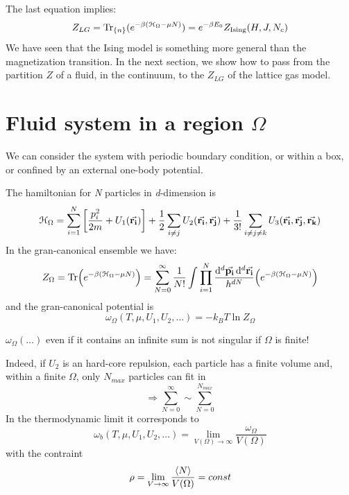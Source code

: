 \documentclass[../main/main.tex]{subfiles}
\begin{document}
The last equation implies:
\begin{equation}
  Z_{LG} = \Tr_{\{n\}}(e^{-\beta (\mathcal{H}_ \Omega -\mu N)} ) = e^{-\beta E_0} Z_{\text{Ising}} (H,J,N_c)
\end{equation}
We have seen that the Ising model is something more general than the magnetization transition.
In the next section, we show how to pass from the partition \( Z \) of a fluid, in the continuum, to the  \( Z_{LG} \) of the lattice gas model.

\section{Fluid system in a region \( \Omega  \) }
We can consider the system with periodic boundary condition, or within a box, or confined by an external one-body potential.

The hamiltonian for \emph{N} particles in \emph{d}-dimension is
\begin{equation}
  \mathcal{H}_ \Omega = \sum_{i=1}^{N} \qty[\frac{p_i^2}{2m} + U_1 (\va{r_i})] + \frac{1}{2} \sum_{i \neq j}^{} U_2 (\va{r_i}, \va{r_j}) + \frac{1}{3!} \sum_{i \neq j \neq k }^{}  U_3 (\va{r_i}, \va{r_j}, \va{r_k})
\end{equation}
In the gran-canonical ensemble we have:
\begin{equation}
  Z_ \Omega = \Tr(e^{-\beta (\mathcal{H}_ \Omega  - \mu N)} ) = \sum_{N=0}^{\infty } \frac{1}{N!} \int_{}^{} \prod_{i=1}^{N} \frac{\dd[d]{\va{p_i}} \dd[d]{\va{r_i}} }{h^{dN}} \qty(e^{-\beta (\mathcal{H}_ \Omega  - \mu N)} )
\end{equation}
and the gran-canonical potential is
\begin{equation}
  \omega _ \Omega (T, \mu , U_1, U_2, \dots) = -k_B T \ln{Z_ \Omega }
\end{equation}
\begin{remark}
\( \omega _ \Omega (\dots) \) even if it contains an infinite sum is not singular if \( \Omega  \) is finite!
\end{remark}
Indeed, if \( U_2 \) is an hard-core repulsion, each particle has a finite volume and, within a finite \( \Omega  \), only \( N_{max} \) particles can fit in
\begin{equation*}
  \Rightarrow \sum_{N=0}^{\infty } \sim \sum_{N=0}^{N_{max}}
\end{equation*}
In the thermodynamic limit it corresponds to
\begin{equation}
  \omega _ b (T, \mu , U_1, U_2, \dots) = \lim_{V (\Omega ) \rightarrow \infty } \frac{\omega
  _ \Omega }{V (\Omega )}
\end{equation}
with the contraint
\begin{equation*}
  \rho = \lim_{V \rightarrow \infty } \frac{\expval{N} }{V (\Omega ) } = const
\end{equation*}
\end{document}

